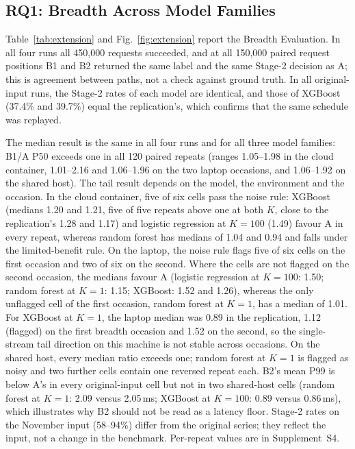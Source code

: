 \documentclass[a4paper,fleqn]{cas-dc}
\begin{document}
\subsection{RQ1: Breadth Across Model Families}
\label{subsec:rq1ext}
Table~\ref{tab:extension} and Fig.~\ref{fig:extension} report the Breadth Evaluation. In all four runs all 450,000 requests succeeded, and at all 150,000 paired request positions B1 and B2 returned the same label and the same Stage-2 decision as A; this is agreement between paths, not a check against ground truth. In all original-input runs, the Stage-2 rates of each model are identical, and those of XGBoost (37.4\% and 39.7\%) equal the replication's, which confirms that the same schedule was replayed.

The median result is the same in all four runs and for all three model families: B1/A P50 exceeds one in all 120 paired repeats (ranges 1.05--1.98 in the cloud container, 1.01--2.16 and 1.06--1.96 on the two laptop occasions, and 1.06--1.92 on the shared host). The tail result depends on the model, the environment and the occasion. In the cloud container, five of six cells pass the noise rule: XGBoost (medians 1.20 and 1.21, five of five repeats above one at both $K$, close to the replication's 1.28 and 1.17) and logistic regression at $K=100$ (1.49) favour A in every repeat, whereas random forest has medians of 1.04 and 0.94 and falls under the limited-benefit rule. On the laptop, the noise rule flags five of six cells on the first occasion and two of six on the second. Where the cells are not flagged on the second occasion, the medians favour A (logistic regression at $K=100$: 1.50; random forest at $K=1$: 1.15; XGBoost: 1.52 and 1.26), whereas the only unflagged cell of the first occasion, random forest at $K=1$, has a median of 1.01. For XGBoost at $K=1$, the laptop median was 0.89 in the replication, 1.12 (flagged) on the first breadth occasion and 1.52 on the second, so the single-stream tail direction on this machine is not stable across occasions. On the shared host, every median ratio exceeds one; random forest at $K=1$ is flagged as noisy and two further cells contain one reversed repeat each. B2's mean P99 is below A's in every original-input cell but not in two shared-host cells (random forest at $K=1$: 2.09 versus 2.05\,ms; XGBoost at $K=100$: 0.89 versus 0.86\,ms), which illustrates why B2 should not be read as a latency floor. Stage-2 rates on the November input (58--94\%) differ from the original series; they reflect the input, not a change in the benchmark. Per-repeat values are in Supplement~S4.
\end{document}
